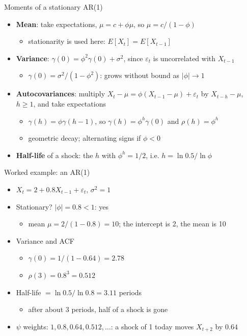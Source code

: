 \begin{frame}{Moments of a stationary AR(1)}
\itemsize{\small}
\begin{itemize}
    \item \textbf{Mean}: take expectations, $\mu = c + \phi\mu$, so $\mu = c/(1 - \phi)$
    \begin{itemize}
        \item stationarity is used here: $E[X_t] = E[X_{t-1}]$
    \end{itemize}
    \item \textbf{Variance}: $\gamma(0) = \phi^2\gamma(0) + \sigma^2$, since $\varepsilon_t$ is uncorrelated with $X_{t-1}$
    \begin{itemize}
        \item $\gamma(0) = \sigma^2/(1 - \phi^2)$: grows without bound as $|\phi| \to 1$
    \end{itemize}
    \item \textbf{Autocovariances}: multiply $X_t - \mu = \phi(X_{t-1} - \mu) + \varepsilon_t$ by $X_{t-h} - \mu$, $h \ge 1$, and take expectations
    \begin{itemize}
        \item $\gamma(h) = \phi\gamma(h - 1)$, so $\gamma(h) = \phi^h\gamma(0)$ and $\rho(h) = \phi^h$
        \item geometric decay; alternating signs if $\phi < 0$
    \end{itemize}
    \item \textbf{Half-life} of a shock: the $h$ with $\phi^h = 1/2$, i.e. $h = \ln 0.5/\ln\phi$
\end{itemize}
\end{frame}

\begin{frame}{Worked example: an AR(1)}
\itemsize{\small}
\begin{itemize}
    \item $X_t = 2 + 0.8X_{t-1} + \varepsilon_t$, $\sigma^2 = 1$
    \item Stationary? $|\phi| = 0.8 < 1$: yes
    \begin{itemize}
        \item mean $\mu = 2/(1 - 0.8) = 10$; the intercept is 2, the mean is 10
    \end{itemize}
    \item Variance and ACF
    \begin{itemize}
        \item $\gamma(0) = 1/(1 - 0.64) = 2.78$
        \item $\rho(3) = 0.8^3 = 0.512$
    \end{itemize}
    \item Half-life $= \ln 0.5/\ln 0.8 = 3.11$ periods
    \begin{itemize}
        \item after about 3 periods, half of a shock is gone
    \end{itemize}
    \item $\psi$ weights: $1, 0.8, 0.64, 0.512, \dots$: a shock of 1 today moves $X_{t+2}$ by $0.64$
\end{itemize}
\end{frame}

